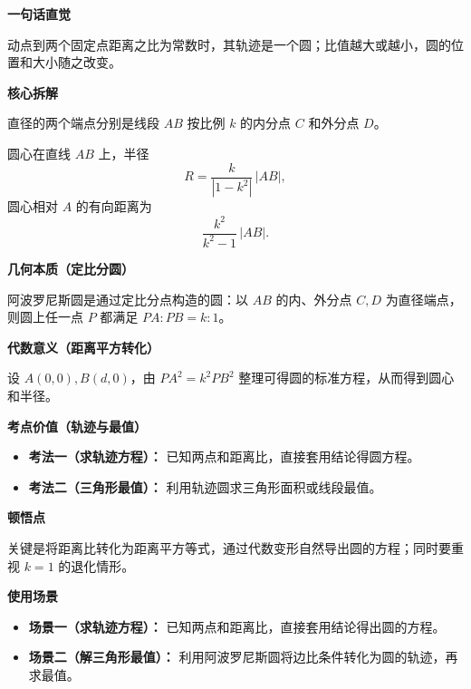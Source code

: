 \begin{explanationbox}
	\textbf{\textcolor{CExplanation}{一句话直觉}}

	动点到两个固定点距离之比为常数时，其轨迹是一个圆；比值越大或越小，圆的位置和大小随之改变。

	\medskip
	\textbf{\textcolor{CExplanation}{核心拆解}}
	\begin{description}[style=nextline, leftmargin=2.8em, labelsep=0.5em, itemsep=0.45em]
		\item[\textbf{要点一（内分外分点）：}]
		      直径的两个端点分别是线段 $AB$ 按比例 $k$ 的内分点 $C$ 和外分点 $D$。
		\item[\textbf{要点二（圆心半径公式）：}]
		      圆心在直线 $AB$ 上，半径
		      \[
			      R=\dfrac{k}{|1-k^{2}|}\,|AB|,
		      \]
		      圆心相对 $A$ 的有向距离为
		      \[
			      \dfrac{k^{2}}{k^{2}-1}\,|AB|.
		      \]
	\end{description}

	\medskip
	\textbf{\textcolor{CExplanation}{几何本质（定比分圆）}}

	阿波罗尼斯圆是通过定比分点构造的圆：以 $AB$ 的内、外分点 $C,D$ 为直径端点，则圆上任一点 $P$ 都满足 $PA:PB=k:1$。

	\medskip
	\textbf{\textcolor{CExplanation}{代数意义（距离平方转化）}}

	设 $A(0,0),B(d,0)$，由 $PA^{2}=k^{2}PB^{2}$ 整理可得圆的标准方程，从而得到圆心和半径。

	\medskip
	\textbf{\textcolor{CExplanation}{考点价值（轨迹与最值）}}
	\begin{itemize}[leftmargin=*, itemsep=0.5em, topsep=0.4em]
		\item \textbf{考法一（求轨迹方程）：} 已知两点和距离比，直接套用结论得圆方程。
		\item \textbf{考法二（三角形最值）：} 利用轨迹圆求三角形面积或线段最值。
	\end{itemize}

	\medskip
	\textbf{\textcolor{CExplanation}{顿悟点}}

	关键是将距离比转化为距离平方等式，通过代数变形自然导出圆的方程；同时要重视 $k=1$ 的退化情形。

	\medskip
	\textbf{\textcolor{CExplanation}{使用场景}}
	\begin{itemize}[leftmargin=*, itemsep=0.5em, topsep=0.4em]
		\item \textbf{场景一（求轨迹方程）：} 已知两点和距离比，直接套用结论得出圆的方程。
		\item \textbf{场景二（解三角形最值）：} 利用阿波罗尼斯圆将边比条件转化为圆的轨迹，再求最值。
	\end{itemize}
\end{explanationbox}